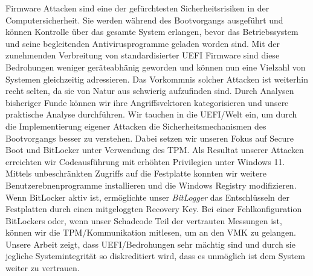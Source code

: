 Firmware Attacken sind eine der gef\"urchtesten Sicherheitsrisiken in der Computersicherheit.
Sie werden w\"ahrend des Bootvorgangs ausgef\"uhrt und k\"onnen Kontrolle \"uber das gesamte System erlangen, bevor das Betriebssystem und seine begleitenden Antivirusprogramme geladen worden sind.
Mit der zunehmenden Verbreitung von standardisierter \acf{UEFI} Firmware sind diese Bedrohungen weniger ger\"ateabh\"anig geworden und k\"onnen nun eine Vielzahl von Systemen gleichzeitig adressieren.
Das Vorkommnis solcher Attacken ist weiterhin recht selten, da sie von Natur aus schwierig aufzufinden sind.
Durch Analysen bisheriger Funde k\"onnen wir ihre Angriffsvektoren kategorisieren und unsere praktische Analyse durchf\"uhren.
Wir tauchen in die \ac{UEFI}\-/Welt ein, um durch die Implementierung eigener Attacken die Sicherheitsmechanismen des Bootvorgangs besser zu verstehen.
Dabei setzen wir unseren Fokus auf Secure Boot und BitLocker unter Verwendung des \acf{TPM}.
Als Resultat unserer Attacken erreichten wir Codeausf\"uhrung mit erh\"ohten Privilegien unter Windows 11.
Mittels unbeschr\"ankten Zugriffs auf die Festplatte konnten wir weitere Benutzerebnenprogramme installieren und die Windows Registry modifizieren.
Wenn BitLocker aktiv ist, erm\"oglichte unser \emph{BitLogger} das Entschl\"usseln der Festplatten durch einen mitgeloggten Recovery Key.
Bei einer Fehlkonfiguration BitLockers oder, wenn unser Schadcode Teil der vertrauten Messungen ist, k\"onnen wir die \ac{TPM}\-/Kommunikation mitlesen, um an den \acf{VMK} zu gelangen.
Unsere Arbeit zeigt, dass \ac{UEFI}\-/Bedrohungen sehr m\"achtig sind und durch sie jegliche Systemintegrit\"at so diskreditiert wird, dass es unm\"oglich ist dem System weiter zu vertrauen.

\acresetall